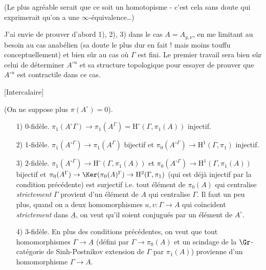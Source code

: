 (Le plus agréable serait que ce soit un homotopisme - c'est cela sans doute qui exprimerait qu'on a une $\infty$-équivalence\dots)

J'ai envie de prouver d'abord 1), 2), 3) dans le cas $A = A_{g, \nu}$, en me limitant au besoin au cas anabélien (sa doute le plus dur en fait ! mais moins touffu conceptuellement) et bien sûr au cas où $\Gamma$ est fini. Le premier travail sera bien sûr celui de déterminer $A^{\circ u}$ et sa structure topologique pour essayer de prouver que $A^{\circ u}$ est contractile dans ce cas.







\newpage

[Intercalaire]

\vskip 2cm

(On ne suppose plus $\pi(A^\circ) =0$).

\begin{enumerate}
    \item[1)] 0-fidèle. $\pi_1 (A^\circ \Gamma) \to \pi_1(A^\Gamma) = \mathrm{H}^\circ(\Gamma, \pi_1(A))$ injectif. 
    \item[2)] 1-fidèle. $\pi_1 (A^{\circ \Gamma}) \to \pi_1(A^\Gamma)$ bijectif et $\pi_0(A^{\circ \Gamma}) \to \mathrm{H}^1(\Gamma, \pi_1)$ injectif.
    \item[3)] 2-fidèle. $\pi_1(A^{\circ \Gamma}) \to \mathrm{H}^\circ (\Gamma, \pi_1(A))$ et $\pi_0 (A^{\circ \Gamma}) \to \mathrm{H}^1(\Gamma, \pi_1(A))$ bijectif et $\pi_0 (A^\Gamma) \to \Ker (\pi_0(A)^\Gamma) \to \mathrm{H}^2(\Gamma, \pi_1)$ (qui est déjà injectif par la condition précédente) est surjectif i.e. tout élément de $\pi_0(A)$ qui centralise \emph{strictement} $\Gamma$ provient d'un élément de $A$ qui centralise $\Gamma$. Il faut un peu plus, quand on a deux homomorphismes $u, v: \Gamma \to A$ qui coïncident \emph{strictement} dans $\underline{A}$, on veut qu'il soient conjugués par un élément de $A^\circ$. 
    \item[4)] 3-fidèle. En plus des conditions précédentes, on veut que tout homomorphismes $\Gamma \to \underline{A}$ (défini par $\Gamma \to \pi_0 (A)$ et un scindage de la $\Gr$-catégorie de Sinh-Postnikov extension de $\Gamma$ par $\pi_1(A)$) provienne d'un homomorphisme $\Gamma \to A$.
\end{enumerate}












